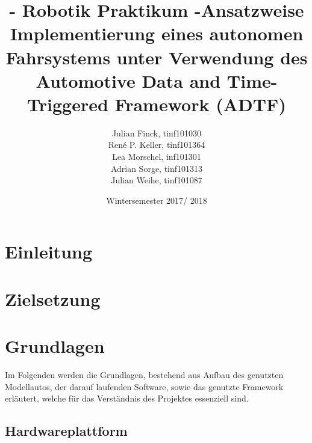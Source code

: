 \documentclass[12pt,a4paper]{report}
\begin{document}
\title{- Robotik Praktikum -\endgraf \endgraf Ansatzweise Implementierung eines autonomen Fahrsystems unter Verwendung des Automotive Data and Time-Triggered Framework (ADTF)}
\author{
  Julian Finck, tinf101030\\
  René P. Keller, tinf101364\\
  Lea Morschel, inf101301\\
  Adrian Sorge, tinf101313\\
  Julian Weihe, tinf101087}
\date{Wintersemester 2017/ 2018}
\maketitle

\newpage

\tableofcontents

\newpage

\chapter{Einleitung}


\chapter{Zielsetzung}


\chapter{Grundlagen}
Im Folgenden werden die Grundlagen, bestehend aus Aufbau des genutzten Modellautos, der darauf laufenden Software, sowie das genutzte Framework erläutert, welche für das Verständnis des Projektes essenziell sind.

\section{Hardwareplattform}
\end{document}
